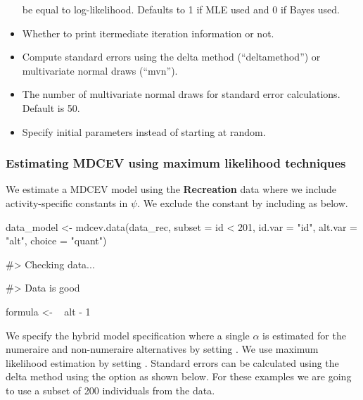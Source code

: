 \begin{itemize}
  be equal to log-likelihood. Defaults to 1 if MLE used and 0 if Bayes
  used.
\item
   Whether to print itermediate iteration
  information or not.
\item
   Compute standard errors using the delta method
  (``deltamethod'') or multivariate normal draws (``mvn'').
\item
   The number of multivariate normal draws for standard
  error calculations. Default is 50.
\item
   Specify initial parameters instead of
  starting at random.
\end{itemize}

\hypertarget{estimating-mdcev-using-maximum-likelihood-techniques}{%
\subsubsection{Estimating MDCEV using maximum likelihood
techniques}\label{estimating-mdcev-using-maximum-likelihood-techniques}}

We estimate a MDCEV model using the \textbf{Recreation} data where we
include activity-specific constants in \(\psi\). We exclude the constant
by including  as below.

\begin{Schunk}
\begin{Sinput}
data_model <- mdcev.data(data_rec, subset = id < 201,
                       id.var = "id",
                       alt.var = "alt",
                       choice = "quant")  
\end{Sinput}
\begin{Soutput}
#> Checking data...
\end{Soutput}
\begin{Soutput}
#> Data is good
\end{Soutput}
\begin{Sinput}
formula <- ~ alt - 1
\end{Sinput}
\end{Schunk}

We specify the hybrid model specification where a single \(\alpha\) is
estimated for the numeraire and non-numeraire alternatives by setting
. We use maximum likelihood estimation by setting
. Standard errors can be calculated using the
delta method using the  option as shown below. For
these examples we are going to use a subset of 200 individuals from the
data.

